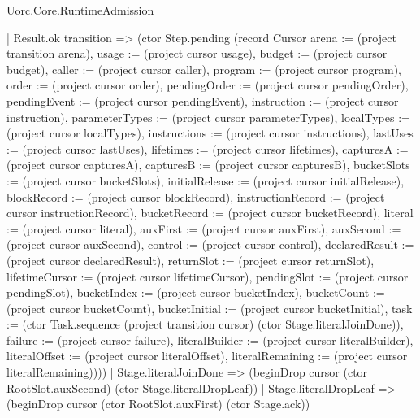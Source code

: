 \begin{lexlean}{Uorc.Core.RuntimeAdmission}
\begin{semanticmodule}
{        | Result.ok transition => (ctor Step.pending (record Cursor {arena := (project transition arena), usage := (project cursor usage), budget := (project cursor budget), caller := (project cursor caller), program := (project cursor program), order := (project cursor order), pendingOrder := (project cursor pendingOrder), pendingEvent := (project cursor pendingEvent), instruction := (project cursor instruction), parameterTypes := (project cursor parameterTypes), localTypes := (project cursor localTypes), instructions := (project cursor instructions), lastUses := (project cursor lastUses), lifetimes := (project cursor lifetimes), capturesA := (project cursor capturesA), capturesB := (project cursor capturesB), bucketSlots := (project cursor bucketSlots), initialRelease := (project cursor initialRelease), blockRecord := (project cursor blockRecord), instructionRecord := (project cursor instructionRecord), bucketRecord := (project cursor bucketRecord), literal := (project cursor literal), auxFirst := (project cursor auxFirst), auxSecond := (project cursor auxSecond), control := (project cursor control), declaredResult := (project cursor declaredResult), returnSlot := (project cursor returnSlot), lifetimeCursor := (project cursor lifetimeCursor), pendingSlot := (project cursor pendingSlot), bucketIndex := (project cursor bucketIndex), bucketCount := (project cursor bucketCount), bucketInitial := (project cursor bucketInitial), task := (ctor Task.sequence (project transition cursor) (ctor Stage.literalJoinDone)), failure := (project cursor failure), literalBuilder := (project cursor literalBuilder), literalOffset := (project cursor literalOffset), literalRemaining := (project cursor literalRemaining)})))
      | Stage.literalJoinDone => (beginDrop cursor (ctor RootSlot.auxSecond) (ctor Stage.literalDropLeaf))
      | Stage.literalDropLeaf => (beginDrop cursor (ctor RootSlot.auxFirst) (ctor Stage.ack))
}
\end{semanticmodule}
\end{lexlean}
